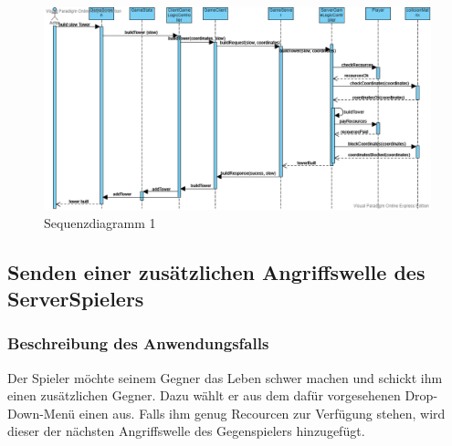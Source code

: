 \documentclass[enabledeprecatedfontcommands,fontsize=12pt,paper=a4,twoside,parskip=half]{scrartcl}
\begin{document}
\begin{figure}[ht!]
    \centering
    \includegraphics[width=\textwidth]{Bilder/sequence_build_slow_tower.png}
    \caption{Sequenzdiagramm 1}
    \label{fig:SyndromansatzSWP}
\end{figure}

\clearpage



\subsection {Senden einer zusätzlichen Angriffswelle des ServerSpielers}

\subsubsection{Beschreibung des Anwendungsfalls}

Der Spieler möchte seinem Gegner das Leben schwer machen und schickt ihm einen zusätzlichen Gegner. Dazu wählt er  aus dem dafür vorgesehenen Drop-Down-Menü einen aus. Falls ihm genug Recourcen zur Verfügung stehen, wird dieser der nächsten Angriffswelle des Gegenspielers hinzugefügt.
\end{document}
